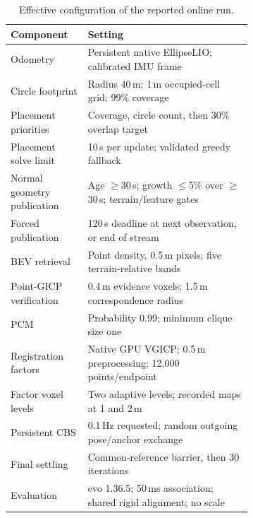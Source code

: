 \begin{table}[htbp]
\centering\small
\caption{Effective configuration of the reported online run.}
\label{tab:settings}
\begin{tabular}{lp{0.68\linewidth}}
\toprule
Component & Setting \\
\midrule
Odometry & Persistent native EllipseLIO; calibrated IMU frame \\
Circle footprint & Radius 40\,m; 1\,m occupied-cell grid; 99\% coverage \\
Placement priorities & Coverage, circle count, then 30\% overlap target \\
Placement solve limit & 10\,s per update; validated greedy fallback \\
Normal geometry publication & Age $\geq$30\,s; growth $\leq$5\% over $\geq$30\,s; terrain/feature gates \\
Forced publication & 120\,s deadline at next observation, or end of stream \\
BEV retrieval & Point density, 0.5\,m pixels; five terrain-relative bands \\
Point-GICP verification & 0.4\,m evidence voxels; 1.5\,m correspondence radius \\
PCM & Probability 0.99; minimum clique size one \\
Registration factors & Native GPU VGICP; 0.5\,m preprocessing; 12,000 points/endpoint \\
Factor voxel levels & Two adaptive levels; recorded maps at 1 and 2\,m \\
Persistent CBS & 0.1\,Hz requested; random outgoing pose/anchor exchange \\
Final settling & Common-reference barrier, then 30 iterations \\
Evaluation & evo 1.36.5; 50\,ms association; shared rigid alignment; no scale \\
\bottomrule
\end{tabular}
\end{table}
